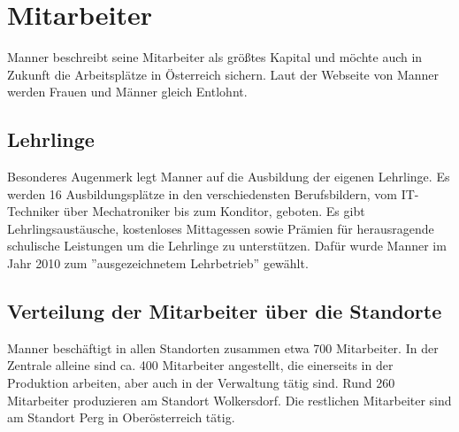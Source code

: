 \section{Mitarbeiter}
Manner beschreibt seine Mitarbeiter als größtes Kapital und möchte auch in Zukunft die Arbeitsplätze in Österreich sichern.
Laut der Webseite von Manner werden Frauen und Männer gleich Entlohnt.\cite{josef_manner_unternehmen}

\subsection{Lehrlinge}
Besonderes Augenmerk legt Manner auf die Ausbildung der eigenen Lehrlinge. Es werden 16 Ausbildungsplätze in den verschiedensten Berufsbildern, vom IT-Techniker über Mechatroniker bis zum Konditor, geboten. Es gibt Lehrlingsaustäusche, kostenloses Mittagessen sowie Prämien für herausragende schulische Leistungen um die Lehrlinge zu unterstützen. Dafür wurde Manner im Jahr 2010 zum ''ausgezeichnetem Lehrbetrieb'' gewählt.\cite{josef_manner_unternehmen}

\subsection{Verteilung der Mitarbeiter über die Standorte}
Manner beschäftigt in allen Standorten zusammen etwa 700 Mitarbeiter. In der Zentrale alleine sind ca. 400 Mitarbeiter angestellt, die einerseits in der Produktion arbeiten, aber auch in der Verwaltung tätig sind. Rund 260 Mitarbeiter produzieren am Standort Wolkersdorf. Die restlichen Mitarbeiter sind am Standort Perg in Oberösterreich tätig.\cite{josef_manner_unternehmen}
